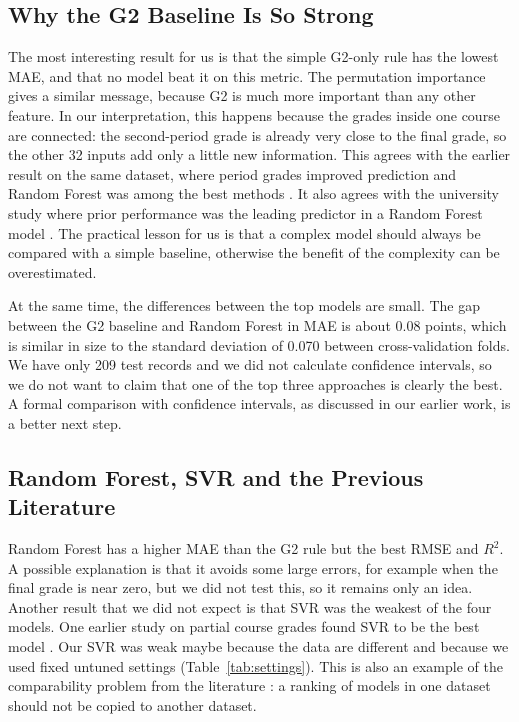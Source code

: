 \documentclass[10pt,twocolumn,a4paper]{article}
\newcommand{\Gtwo}{G2}
\begin{document}
\subsection{Why the G2 Baseline Is So Strong}
The most interesting result for us is that the simple G2-only rule has the lowest MAE, and that no model beat it on this metric. The permutation importance gives a similar message, because \Gtwo{} is much more important than any other feature. In our interpretation, this happens because the grades inside one course are connected: the second-period grade is already very close to the final grade, so the other 32 inputs add only a little new information. This agrees with the earlier result on the same dataset, where period grades improved prediction and Random Forest was among the best methods \cite{cortez2008}. It also agrees with the university study where prior performance was the leading predictor in a Random Forest model \cite{nachouki2023}. The practical lesson for us is that a complex model should always be compared with a simple baseline, otherwise the benefit of the complexity can be overestimated.

At the same time, the differences between the top models are small. The gap between the G2 baseline and Random Forest in MAE is about 0.08 points, which is similar in size to the standard deviation of 0.070 between cross-validation folds. We have only 209 test records and we did not calculate confidence intervals, so we do not want to claim that one of the top three approaches is clearly the best. A formal comparison with confidence intervals, as discussed in our earlier work, is a better next step.

\subsection{Random Forest, SVR and the Previous Literature}
Random Forest has a higher MAE than the G2 rule but the best RMSE and $R^2$. A possible explanation is that it avoids some large errors, for example when the final grade is near zero, but we did not test this, so it remains only an idea. Another result that we did not expect is that SVR was the weakest of the four models. One earlier study on partial course grades found SVR to be the best model \cite{hidalgo2023}. Our SVR was weak maybe because the data are different and because we used fixed untuned settings (Table~\ref{tab:settings}). This is also an example of the comparability problem from the literature \cite{hellas2018}: a ranking of models in one dataset should not be copied to another dataset.
\end{document}
